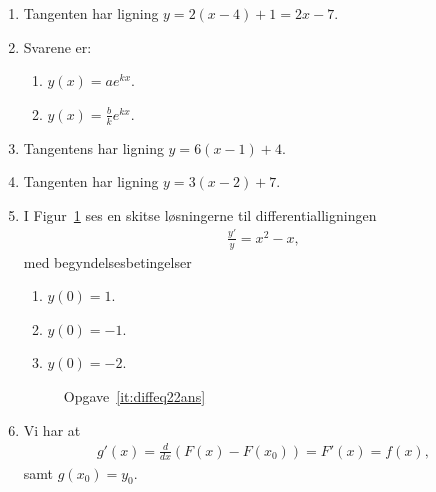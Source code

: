 \begin{enumerate}
		\item Tangenten har ligning $y=2(x-4)+1=2x-7$. 
		
	\item Svarene er:
	\begin{enumerate}
		\item $y(x)=ae^{kx}$.
		\item $y(x)=\frac{b}{k}e^{kx}$.
	\end{enumerate}
	
	
	\item Tangentens har ligning $y= 6(x-1)+4$.	
	
	
	\item Tangenten har ligning $y=3(x-2)+7$.
	
	\item \label{it:diffeq22ans}	I Figur~\ref{fig:diffeq22ans} ses en skitse løsningerne til differentialligningen
	\begin{align*}
	\frac{y'}{y}=x^2-x,
	\end{align*}
	med begyndelsesbetingelser
	\begin{enumerate}
		\item $y(0)=1$.
		\item $y(0)=-1$.
		\item $y(0)=-2$.
	\end{enumerate}
	
	
	\begin{figure}
		\centering
		\caption{Opgave~\ref{it:diffeq22ans}}
		\label{fig:diffeq22ans}
	\end{figure}
	
	
	
	\item Vi har at 
	\begin{align*}
	g'(x)=\frac{d}{dx}(F(x)-F(x_0))=F'(x)=f(x),
	\end{align*}
	samt $g(x_0)=y_0$.
	
	
	
	
	
	
	
\end{enumerate}